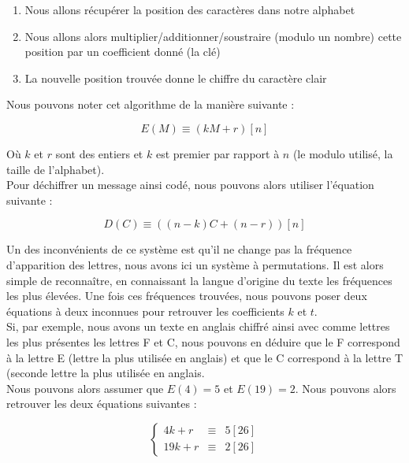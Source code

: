 \begin{enumerate}
 \item Nous allons récupérer la position des caractères dans notre alphabet
 \item Nous allons alors multiplier/additionner/soustraire (modulo un nombre) cette position par un coefficient donné (la clé)
 \item La nouvelle position trouvée donne le chiffre du caractère clair
\end{enumerate}
Nous pouvons noter cet algorithme de la manière suivante :
\begin{center}
    \begin{equation}
	E(M)\equiv (kM+r)[n]
    \end{equation}
\end{center}
Où $k$ et $r$ sont des entiers et $k$ est premier par rapport à $n$ (le modulo utilisé, la taille de l'alphabet).\\
Pour déchiffrer un message ainsi codé, nous pouvons alors utiliser l'équation suivante :
\begin{center}
    \begin{equation}
	D(C)\equiv ((n-k)C+(n-r))[n]
    \end{equation}
\end{center}
Un des inconvénients de ce système est qu'il ne change pas la fréquence d'apparition des lettres, nous avons ici un système à permutations. Il est alors simple de reconnaître, en connaissant la langue d'origine du texte les fréquences les plus élevées. Une fois ces fréquences trouvées, nous pouvons poser deux équations à deux inconnues pour retrouver les coefficients $k$ et $t$.\\
Si, par exemple, nous avons un texte en anglais chiffré ainsi avec comme lettres les plus présentes les lettres F et C, nous pouvons en déduire que le F correspond à la lettre E (lettre la plus utilisée en anglais) et que le C correspond à la lettre T (seconde lettre la plus utilisée en anglais.\\
Nous pouvons alors assumer que $E(4)=5$ et $E(19)=2$. Nous pouvons alors retrouver les deux équations suivantes :
\begin{center}
    \begin{equation}
	\left\{
	\begin{array}{lll}
	    4k+r & \equiv & 5[26] \\
	    19k+r & \equiv & 2[26]
	\end{array}
	\right.
    \end{equation}
\end{center}
